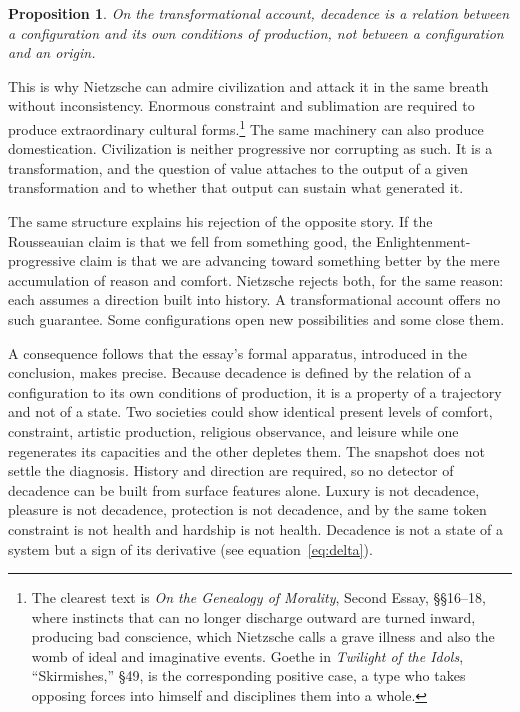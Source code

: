 \documentclass[11pt]{article}
\newtheorem{proposition}{Proposition}
\theoremstyle{definition}
\begin{document}
\begin{proposition}
On the transformational account, decadence is a relation between a configuration and its own conditions of production, not between a configuration and an origin.
\end{proposition}

This is why Nietzsche can admire civilization and attack it in the same breath without inconsistency. Enormous constraint and sublimation are required to produce extraordinary cultural forms.\footnote{The clearest text is \emph{On the Genealogy of Morality}, Second Essay, \S\S16--18, where instincts that can no longer discharge outward are turned inward, producing bad conscience, which Nietzsche calls a grave illness and also the womb of ideal and imaginative events. Goethe in \emph{Twilight of the Idols}, ``Skirmishes,'' \S49, is the corresponding positive case, a type who takes opposing forces into himself and disciplines them into a whole.} The same machinery can also produce domestication. Civilization is neither progressive nor corrupting as such. It is a transformation, and the question of value attaches to the output of a given transformation and to whether that output can sustain what generated it.

The same structure explains his rejection of the opposite story. If the Rousseauian claim is that we fell from something good, the Enlightenment-progressive claim is that we are advancing toward something better by the mere accumulation of reason and comfort. Nietzsche rejects both, for the same reason: each assumes a direction built into history. A transformational account offers no such guarantee. Some configurations open new possibilities and some close them.

A consequence follows that the essay's formal apparatus, introduced in the conclusion, makes precise. Because decadence is defined by the relation of a configuration to its own conditions of production, it is a property of a trajectory and not of a state. Two societies could show identical present levels of comfort, constraint, artistic production, religious observance, and leisure while one regenerates its capacities and the other depletes them. The snapshot does not settle the diagnosis. History and direction are required, so no detector of decadence can be built from surface features alone. Luxury is not decadence, pleasure is not decadence, protection is not decadence, and by the same token constraint is not health and hardship is not health. Decadence is not a state of a system but a sign of its derivative (see equation~\eqref{eq:delta}).
\end{document}
